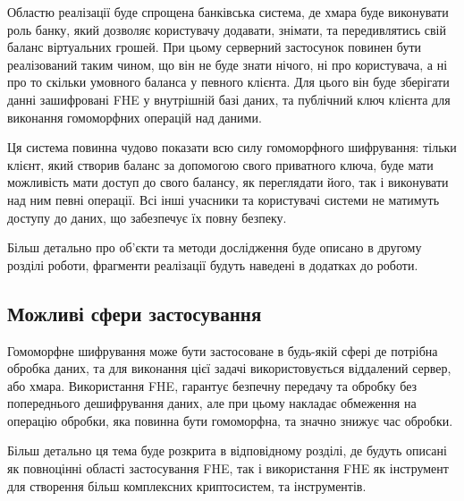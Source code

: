 Областю реалізації буде спрощена банківська система, де хмара буде виконувати роль банку,
який дозволяє користувачу додавати, знімати, та передивлятись свій баланс віртуальних грошей.
При цьому серверний застосунок повинен бути реалізований таким чином, що він не буде знати
нічого, ні про користувача, а ні про то скільки умовного баланса у певного клієнта. Для цього
він буде зберігати данні зашифровані FHE у внутрішній базі даних, та публічний ключ клієнта
для виконання гомоморфних операцій над даними.

Ця система повинна чудово показати всю силу гомоморфного шифрування: тільки клієнт, який
створив баланс за допомогою свого приватного ключа, буде мати можливість мати доступ до свого
балансу, як переглядати його, так і виконувати над ним певні операції. Всі інші учасники та 
користувачі системи не матимуть доступу до даних, що забезпечує їх повну безпеку.

Більш детально про об'єкти та методи дослідження буде описано в другому розділі роботи, 
фрагменти реалізації будуть наведені в додатках до роботи.

\subsection*{Можливі сфери застосування}
Гомоморфне шифрування може бути застосоване в будь-якій сфері де потрібна обробка
даних, та для виконання цієї задачі використовується віддалений сервер, або хмара.
Використання FHE, гарантує безпечну передачу та обробку без попереднього дешифрування
даних, але при цьому накладає обмеження на операцію обробки, яка повинна бути
гомоморфна, та значно знижує час обробки.

Більш детально ця тема буде розкрита в відповідному розділі, де будуть описані як
повноцінні області застосування FHE, так і використання FHE як інструмент для створення
більш комплексних криптосистем, та інструментів.


